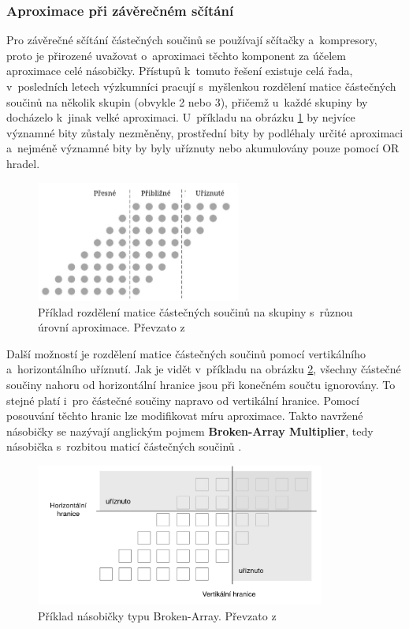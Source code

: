 \subsubsection{Aproximace při závěrečném sčítání}
Pro závěrečné sčítání částečných součinů se používají sčítačky a~kompresory, proto je přirozené uvažovat o~aproximaci těchto komponent za účelem aproximace celé násobičky. Přístupů k~tomuto řešení existuje celá řada, v~posledních letech výzkumníci pracují s~myšlenkou rozdělení matice částečných součinů na několik skupin (obvykle 2 nebo 3), přičemž u~každé skupiny by docházelo k~jinak velké aproximaci. U~příkladu na obrázku \ref{fig:accumulation_approx} by nejvíce významné bity zůstaly nezměněny, prostřední bity by podléhaly určité aproximaci a~nejméně významné bity by byly uříznuty nebo akumulovány pouze pomocí OR hradel.

\begin{figure}[H]
    \centering
    \includegraphics[width=0.6\textwidth]{obrazky-figures/accumulation_approx.png}
    \caption{Příklad rozdělení matice částečných součinů na skupiny s~různou úrovní aproximace. Převzato z~\cite{approx_mult_survey}}
    \label{fig:accumulation_approx}
\end{figure}

Další možností je rozdělení matice částečných součinů pomocí vertikálního a~horizontálního uříznutí. Jak je vidět v~příkladu na obrázku \ref{fig:bam}, všechny částečné součiny nahoru od horizontální hranice jsou při konečném součtu ignorovány. To stejné platí i~pro částečné součiny napravo od vertikální hranice. Pomocí posouvání těchto hranic lze modifikovat míru aproximace. Takto navržené násobičky se nazývají anglickým pojmem \textbf{Broken-Array Multiplier}, tedy násobička s~rozbitou maticí částečných součinů \cite{bio_inspired_blocks}. 

\begin{figure}[H]
    \centering
    \includegraphics[width=0.85\textwidth]{obrazky-figures/bam.png}
    \caption{Příklad násobičky typu Broken-Array. Převzato z~\cite{bio_inspired_blocks}}
    \label{fig:bam}
\end{figure}

